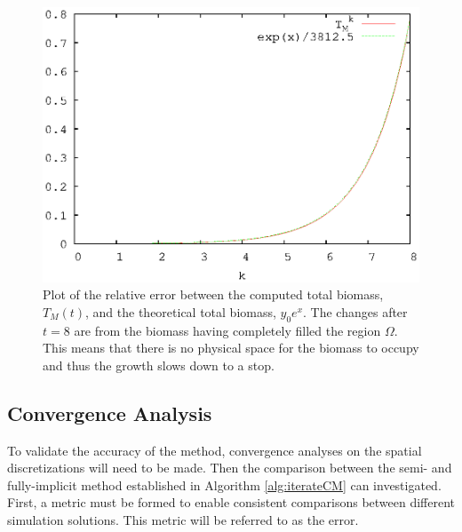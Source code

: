   \begin{figure}
    \centering
    \includegraphics[scale = 0.9]{basic_growth}
    \caption{Plot of the relative error between the computed total biomass, $T_{M}(t)$, and the theoretical total biomass, $y_0 e^x$. 
      The changes after $t = 8$ are from the biomass having completely filled the region $\Omega$.
      This means that there is no physical space for the biomass to occupy and thus the growth slows down to a stop.}
    \label{fig:basic_growth}
  \end{figure}
  

\subsection{Convergence Analysis}
  To validate the accuracy of the method, convergence analyses on the spatial discretizations will need to be made. 
  Then the comparison between the semi- and fully-implicit method established in Algorithm \ref{alg:iterateCM} can investigated.
  First, a metric must be formed to enable consistent comparisons between different simulation solutions. 
  This metric will be referred to as the error. %

